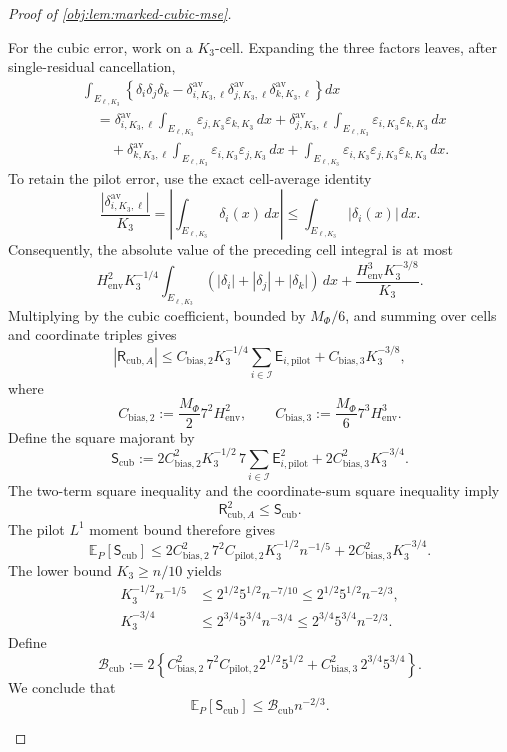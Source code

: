 \documentclass[11pt]{article}
\begin{document}
\begin{proof}[Proof of \cref{obj:lem:marked-cubic-mse}]
\begin{enumerate}
For the cubic error, work on a \(K_3\)-cell. Expanding the three factors leaves, after single-residual cancellation,
\[
\begin{aligned}
&\int_{E_{\ell,K_3}}
\left\{
\delta_i\delta_j\delta_k
-\delta^{\mathrm{av}}_{i,K_3,\ell}
 \delta^{\mathrm{av}}_{j,K_3,\ell}
 \delta^{\mathrm{av}}_{k,K_3,\ell}
\right\}dx\\
&\quad=
\delta^{\mathrm{av}}_{i,K_3,\ell}
\int_{E_{\ell,K_3}}\varepsilon_{j,K_3}\varepsilon_{k,K_3}\,dx
+\delta^{\mathrm{av}}_{j,K_3,\ell}
\int_{E_{\ell,K_3}}\varepsilon_{i,K_3}\varepsilon_{k,K_3}\,dx\\
&\qquad+
\delta^{\mathrm{av}}_{k,K_3,\ell}
\int_{E_{\ell,K_3}}\varepsilon_{i,K_3}\varepsilon_{j,K_3}\,dx
+\int_{E_{\ell,K_3}}
\varepsilon_{i,K_3}\varepsilon_{j,K_3}\varepsilon_{k,K_3}\,dx.
\end{aligned}
\]
To retain the pilot error, use the exact cell-average identity
\[
\frac{|\delta^{\mathrm{av}}_{i,K_3,\ell}|}{K_3}
=
\left|\int_{E_{\ell,K_3}}\delta_i(x)\,dx\right|
\le\int_{E_{\ell,K_3}}|\delta_i(x)|\,dx.
\]
Consequently, the absolute value of the preceding cell integral is at most
\[
H_{\mathrm{env}}^2K_3^{-1/4}
\int_{E_{\ell,K_3}}(|\delta_i|+|\delta_j|+|\delta_k|)\,dx
+\frac{H_{\mathrm{env}}^3K_3^{-3/8}}{K_3}.
\]
Multiplying by the cubic coefficient, bounded by \(M_\Phi/6\), and summing over cells and coordinate triples gives
\[
|\mathsf R_{\mathrm{cub},A}|
\le
C_{\mathrm{bias},2}K_3^{-1/4}
\sum_{i\in\mathcal I}\mathsf E_{i,\mathrm{pilot}}
+C_{\mathrm{bias},3}K_3^{-3/8},
\]
where
\[
C_{\mathrm{bias},2}
:=\frac{M_\Phi}{2}7^2H_{\mathrm{env}}^2,
\qquad
C_{\mathrm{bias},3}
:=\frac{M_\Phi}{6}7^3H_{\mathrm{env}}^3.
\]
Define the square majorant by
\[
\mathsf S_{\mathrm{cub}}
:=
2C_{\mathrm{bias},2}^2K_3^{-1/2}
\,7\sum_{i\in\mathcal I}\mathsf E_{i,\mathrm{pilot}}^2
+2C_{\mathrm{bias},3}^2K_3^{-3/4}.
\]
The two-term square inequality and the coordinate-sum square inequality imply
\[
\mathsf R_{\mathrm{cub},A}^2\le\mathsf S_{\mathrm{cub}}.
\]
The pilot \(L^1\) moment bound therefore gives
\[
\mathbb E_P[\mathsf S_{\mathrm{cub}}]
\le
2C_{\mathrm{bias},2}^2\,7^2C_{\mathrm{pilot},2}
K_3^{-1/2}n^{-1/5}
+2C_{\mathrm{bias},3}^2K_3^{-3/4}.
\]
The lower bound \(K_3\ge n/10\) yields
\[
\begin{aligned}
K_3^{-1/2}n^{-1/5}
&\le2^{1/2}5^{1/2}n^{-7/10}
\le2^{1/2}5^{1/2}n^{-2/3},\\
K_3^{-3/4}
&\le2^{3/4}5^{3/4}n^{-3/4}
\le2^{3/4}5^{3/4}n^{-2/3}.
\end{aligned}
\]
Define
\[
\mathcal B_{\mathrm{cub}}
:=
2\left\{
C_{\mathrm{bias},2}^2\,7^2C_{\mathrm{pilot},2}
2^{1/2}5^{1/2}
+C_{\mathrm{bias},3}^2\,2^{3/4}5^{3/4}
\right\}.
\]
We conclude that
\[
\mathbb E_P[\mathsf S_{\mathrm{cub}}]
\le\mathcal B_{\mathrm{cub}}n^{-2/3}.
\]


\end{enumerate}
\end{proof}
\end{document}
